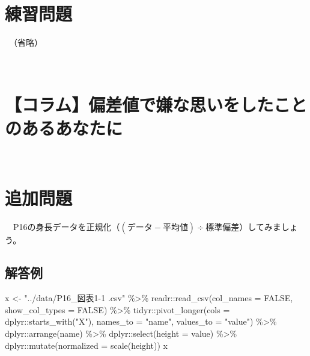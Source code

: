 \documentclass[
  12pt,
]{book}
\newenvironment{Shaded}{\begin{snugshade}}{\end{snugshade}}
\newcommand{\AttributeTok}[1]{\textcolor[rgb]{0.77,0.63,0.00}{#1}}
\newcommand{\ConstantTok}[1]{\textcolor[rgb]{0.00,0.00,0.00}{#1}}
\newcommand{\FunctionTok}[1]{\textcolor[rgb]{0.00,0.00,0.00}{#1}}
\newcommand{\NormalTok}[1]{#1}
\newcommand{\OtherTok}[1]{\textcolor[rgb]{0.56,0.35,0.01}{#1}}
\newcommand{\SpecialCharTok}[1]{\textcolor[rgb]{0.00,0.00,0.00}{#1}}
\newcommand{\StringTok}[1]{\textcolor[rgb]{0.31,0.60,0.02}{#1}}
\begin{document}
\hypertarget{ux7df4ux7fd2ux554fux984c-3}{%
\section*{練習問題}\label{ux7df4ux7fd2ux554fux984c-3}}

　（省略）

　

\hypertarget{ux30b3ux30e9ux30e0ux504fux5deeux5024ux3067ux5accux306aux601dux3044ux3092ux3057ux305fux3053ux3068ux306eux3042ux308bux3042ux306aux305fux306b}{%
\section*{【コラム】偏差値で嫌な思いをしたことのあるあなたに}\label{ux30b3ux30e9ux30e0ux504fux5deeux5024ux3067ux5accux306aux601dux3044ux3092ux3057ux305fux3053ux3068ux306eux3042ux308bux3042ux306aux305fux306b}}

　

\hypertarget{ux8ffdux52a0ux554fux984c-2}{%
\section*{追加問題}\label{ux8ffdux52a0ux554fux984c-2}}

　P16の身長データを正規化（\((\mbox{データ} - \mbox{平均値}) \div \mbox{標準偏差}\)）してみましょう。

\hypertarget{ux89e3ux7b54ux4f8b-4}{%
\subsection*{解答例}\label{ux89e3ux7b54ux4f8b-4}}

\begin{Shaded}
\begin{Highlighting}[]
\NormalTok{x }\OtherTok{\textless{}{-}} \StringTok{"../data/P16\_図表1{-}1 .csv"} \SpecialCharTok{\%\textgreater{}\%} 
\NormalTok{  readr}\SpecialCharTok{::}\FunctionTok{read\_csv}\NormalTok{(}\AttributeTok{col\_names =} \ConstantTok{FALSE}\NormalTok{, }\AttributeTok{show\_col\_types =} \ConstantTok{FALSE}\NormalTok{) }\SpecialCharTok{\%\textgreater{}\%} 
\NormalTok{  tidyr}\SpecialCharTok{::}\FunctionTok{pivot\_longer}\NormalTok{(}\AttributeTok{cols =}\NormalTok{ dplyr}\SpecialCharTok{::}\FunctionTok{starts\_with}\NormalTok{(}\StringTok{"X"}\NormalTok{),}
                      \AttributeTok{names\_to =} \StringTok{"name"}\NormalTok{, }\AttributeTok{values\_to =} \StringTok{"value"}\NormalTok{) }\SpecialCharTok{\%\textgreater{}\%} 
\NormalTok{  dplyr}\SpecialCharTok{::}\FunctionTok{arrange}\NormalTok{(name) }\SpecialCharTok{\%\textgreater{}\%} 
\NormalTok{  dplyr}\SpecialCharTok{::}\FunctionTok{select}\NormalTok{(}\AttributeTok{height =}\NormalTok{ value) }\SpecialCharTok{\%\textgreater{}\%} 
\NormalTok{  dplyr}\SpecialCharTok{::}\FunctionTok{mutate}\NormalTok{(}\AttributeTok{normalized =} \FunctionTok{scale}\NormalTok{(height))}
\NormalTok{x}
\end{Highlighting}
\end{Shaded}
\end{document}
